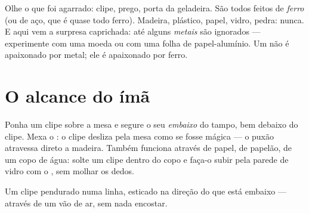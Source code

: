 \begin{example}\label{ex:g1:magnets:iron}
Olhe o que foi agarrado: clipe, prego, porta da geladeira. São todos
feitos de \emph{ferro} (ou de aço, que é quase todo ferro). Madeira,
plástico, papel, vidro, pedra: nunca. E aqui vem a surpresa
caprichada: até alguns \emph{metais} são ignorados --- experimente
com uma moeda ou com uma folha de papel-alumínio. Um  não é
apaixonado por metal; ele é apaixonado por ferro.
\end{example}

\section{O alcance do ímã}

\begin{example}\label{ex:g1:magnets:through}
Ponha um clipe sobre a mesa e segure o seu  \emph{embaixo} do
tampo, bem debaixo do clipe. Mexa o : o clipe desliza pela mesa
como se fosse mágica --- o puxão atravessa direto a madeira. Também
funciona através de papel, de papelão, de um copo de água: solte um
clipe dentro do copo e faça-o subir pela parede de vidro com o ,
sem molhar os dedos.
\end{example}

\begin{omfigure}

{\small Um clipe pendurado numa linha, esticado na direção do 
que está embaixo --- através de um vão de ar, sem nada encostar.}
\end{omfigure}

